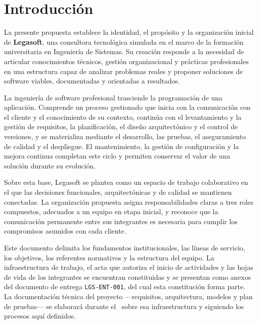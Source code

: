
\section{Introducción}

La presente propuesta establece la identidad, el propósito y la organización
inicial de \textbf{Legasoft}, una consultora tecnológica simulada en el marco de
la formación universitaria en Ingeniería de Sistemas. Su creación responde a la
necesidad de articular conocimientos técnicos, gestión organizacional y prácticas
profesionales en una estructura capaz de analizar problemas reales y proponer
soluciones de software viables, documentadas y orientadas a resultados.

La ingeniería de software profesional trasciende la programación de una
aplicación. Comprende un proceso gestionado que inicia con la comunicación con el
cliente y el conocimiento de su contexto, continúa con el levantamiento y la
gestión de requisitos, la planificación, el diseño arquitectónico y el control de
versiones, y se materializa mediante el desarrollo, las pruebas, el aseguramiento
de calidad y el despliegue. El mantenimiento, la gestión de configuración y la
mejora continua completan este ciclo y permiten conservar el valor de una
solución durante su evolución.

Sobre esta base, Legasoft se plantea como un espacio de trabajo colaborativo en
el que las decisiones funcionales, arquitectónicas y de calidad se mantienen
conectadas. La organización propuesta asigna responsabilidades claras a tres
roles compuestos, adecuados a un equipo en etapa inicial, y reconoce que la
comunicación permanente entre sus integrantes es necesaria para cumplir los
compromisos asumidos con cada cliente.

Este documento delimita los fundamentos institucionales, las líneas de servicio,
los objetivos, los referentes normativos y la estructura del equipo. La
infraestructura de trabajo, el acta que autoriza el inicio de actividades y las
hojas de vida de los integrantes se encuentran constituidas y se presentan como
anexos del documento de entrega \texttt{LGS-ENT-001}, del cual esta constitución
forma parte. La documentación técnica del proyecto —requisitos, arquitectura,
modelos y plan de pruebas— se elaborará durante el \lgSemestre\ sobre esa
infraestructura y siguiendo los procesos aquí definidos.

